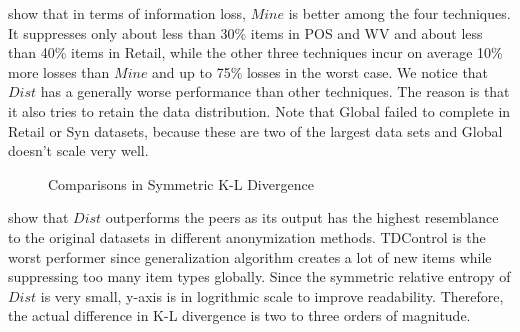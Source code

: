  show that in terms 
of information loss, $Mine$ is better among the four techniques.
It suppresses only about less than 30\% items in POS and WV and about 
less than 40\% items in Retail, while the other three techniques 
incur on average 10\% more losses than $Mine$ and up to 75\% 
losses in the worst case. We notice that $Dist$ has a generally 
worse performance than other techniques.
The reason is that it also tries to retain the data distribution.
Note that Global failed to complete in Retail or Syn datasets,
because these are two of the largest data sets and Global 
doesn't scale very well. 


\begin{figure}[th]
\centering
{}
\caption{Comparisons in Symmetric K-L Divergence}
\label{fig:entropy}
\end{figure}

 show that $Dist$ 
outperforms the peers as its output has the highest 
resemblance to the original datasets in different anonymization methods. TDControl is the worst performer
since generalization algorithm creates a lot of new items while
suppressing too many item types globally. 
Since the symmetric relative entropy of $Dist$ is very small, 
y-axis is in logrithmic scale to improve readability. 
Therefore, the actual difference in K-L divergence is two 
to three orders of magnitude.

